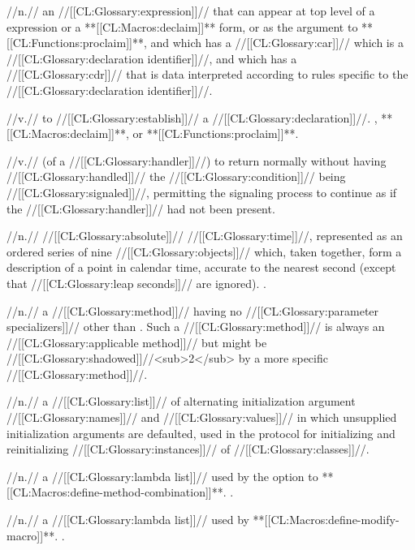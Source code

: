  //n.// an //[[CL:Glossary:expression]]// that can appear at top level of a  expression or a **[[CL:Macros:declaim]]** form, or as the argument to **[[CL:Functions:proclaim]]**, and which has a //[[CL:Glossary:car]]// which is a //[[CL:Glossary:declaration identifier]]//, and which has a //[[CL:Glossary:cdr]]// that is data interpreted according to rules specific to the //[[CL:Glossary:declaration identifier]]//.

 //v.// to //[[CL:Glossary:establish]]// a //[[CL:Glossary:declaration]]//. , **[[CL:Macros:declaim]]**, or **[[CL:Functions:proclaim]]**.

 //v.// (of a //[[CL:Glossary:handler]]//) to return normally without having //[[CL:Glossary:handled]]// the //[[CL:Glossary:condition]]// being //[[CL:Glossary:signaled]]//, permitting the signaling process to continue as if the //[[CL:Glossary:handler]]// had not been present.

 //n.// //[[CL:Glossary:absolute]]// //[[CL:Glossary:time]]//, represented as an ordered series of nine //[[CL:Glossary:objects]]// which, taken together, form a description of a point in calendar time, accurate to the nearest second (except that //[[CL:Glossary:leap seconds]]// are ignored). \Seesection\DecodedTime.

 //n.// a //[[CL:Glossary:method]]// having no //[[CL:Glossary:parameter specializers]]// other than . Such a //[[CL:Glossary:method]]// is always an //[[CL:Glossary:applicable method]]// but might be //[[CL:Glossary:shadowed]]//<sub>2</sub> by a more specific //[[CL:Glossary:method]]//.

 //n.// a //[[CL:Glossary:list]]// of alternating initialization argument //[[CL:Glossary:names]]// and //[[CL:Glossary:values]]// in which unsupplied initialization arguments are defaulted, used in the protocol for initializing and reinitializing //[[CL:Glossary:instances]]// of //[[CL:Glossary:classes]]//.

 //n.// a //[[CL:Glossary:lambda list]]// used by the  option to **[[CL:Macros:define-method-combination]]**. \Seesection\DefMethCombArgsLambdaLists.

 //n.// a //[[CL:Glossary:lambda list]]// used by **[[CL:Macros:define-modify-macro]]**. \Seesection\DefineModifyMacroLambdaLists.

